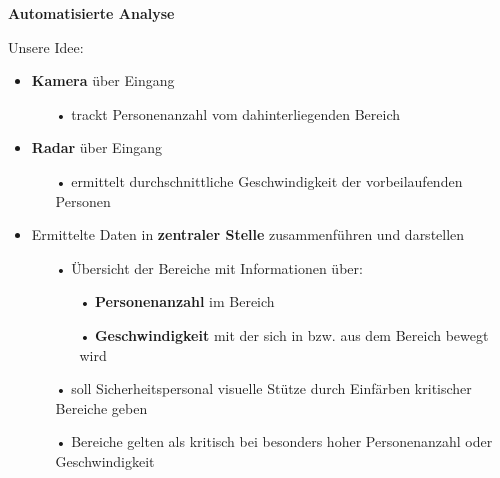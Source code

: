 \documentclass[%
textcolor=radacc_lightBlue,	%
pagecolor=radacc_darkblue,		%
]{../estposter}
\begin{document}
\begin{textblock}{12.5}
\color{radacc_blue}
\textbf{Automatisierte Analyse }
\par\smallskip

\color{radacc_lightBlue}
Unsere Idee:
\begin{itemize}[leftmargin=10pt, rightmargin=10pt, topsep=3pt,itemsep=1pt,partopsep=1pt, parsep=1pt]
	\item \textbf{Kamera} über Eingang
		
	 	\begin{itemize}
			\item[•] trackt Personenanzahl vom dahinterliegenden Bereich
		\end{itemize}
		
	\item \textbf{Radar} über Eingang
	 	\begin{itemize}
			\item[•] ermittelt durchschnittliche Geschwindigkeit der vorbeilaufenden Personen
		\end{itemize}

	\item Ermittelte Daten in \textbf{zentraler Stelle} zusammenführen und darstellen
	
		\begin{itemize}
			\item[•] Übersicht der Bereiche mit Informationen über:
			
				\begin{itemize}
					\item[•] \textbf{Personenanzahl} im Bereich
					\item[•] \textbf{Geschwindigkeit} mit der sich in bzw. aus dem Bereich bewegt wird
				\end{itemize}
				
			\item[•] soll Sicherheitspersonal visuelle Stütze durch Einfärben kritischer Bereiche geben
			\item[•] Bereiche gelten als kritisch bei besonders hoher Personenanzahl oder Geschwindigkeit
		\end{itemize}

\end{itemize}


\begin{addmargin}[0pt]{30mm}
\end{addmargin}



\end{textblock}
\end{document}
